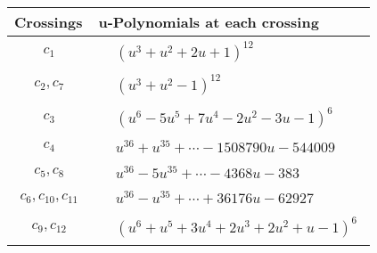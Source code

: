 \documentclass[1p]{elsarticle_modified}
\theoremstyle{definition}
\begin{document}
\begin{tabular}{m{50pt}|m{274pt}}
Crossings & \hspace{64pt}u-Polynomials at each crossing \\
\hline $$\begin{aligned}c_{1}\end{aligned}$$&$\begin{aligned}
&(u^3+u^2+2 u+1)^{12}
\end{aligned}$\\
\hline $$\begin{aligned}c_{2},c_{7}\end{aligned}$$&$\begin{aligned}
&(u^3+u^2-1)^{12}
\end{aligned}$\\
\hline $$\begin{aligned}c_{3}\end{aligned}$$&$\begin{aligned}
&(u^6-5 u^5+7 u^4-2 u^2-3 u-1)^6
\end{aligned}$\\
\hline $$\begin{aligned}c_{4}\end{aligned}$$&$\begin{aligned}
&u^{36}+u^{35}+\cdots-1508790 u-544009
\end{aligned}$\\
\hline $$\begin{aligned}c_{5},c_{8}\end{aligned}$$&$\begin{aligned}
&u^{36}-5 u^{35}+\cdots-4368 u-383
\end{aligned}$\\
\hline $$\begin{aligned}c_{6},c_{10},c_{11}\end{aligned}$$&$\begin{aligned}
&u^{36}- u^{35}+\cdots+36176 u-62927
\end{aligned}$\\
\hline $$\begin{aligned}c_{9},c_{12}\end{aligned}$$&$\begin{aligned}
&(u^6+u^5+3 u^4+2 u^3+2 u^2+u-1)^6
\end{aligned}$\\
\hline
\end{tabular}\\~\\
\newpage\renewcommand{\arraystretch}{1}
\end{document}
